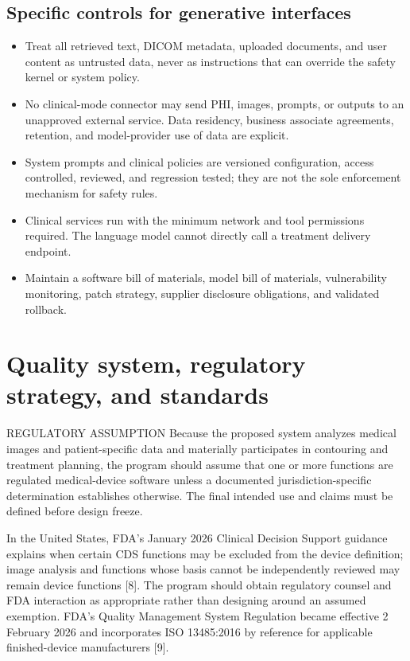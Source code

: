 \documentclass[11pt,letterpaper]{article}
\begin{document}
\subsection{Specific controls for generative interfaces}

\begin{itemize}
\item Treat all retrieved text, DICOM metadata, uploaded documents, and user content as untrusted data, never as instructions that can override the safety kernel or system policy.
\item No clinical-mode connector may send PHI, images, prompts, or outputs to an unapproved external service. Data residency, business associate agreements, retention, and model-provider use of data are explicit.
\item System prompts and clinical policies are versioned configuration, access controlled, reviewed, and regression tested; they are not the sole enforcement mechanism for safety rules.
\item Clinical services run with the minimum network and tool permissions required. The language model cannot directly call a treatment delivery endpoint.
\item Maintain a software bill of materials, model bill of materials, vulnerability monitoring, patch strategy, supplier disclosure obligations, and validated rollback.
\end{itemize}

\section{Quality system, regulatory strategy, and standards}

\begin{nlnotice}{REGULATORY ASSUMPTION}
Because the proposed system analyzes medical images and patient-specific data and materially participates in contouring and treatment planning, the program should assume that one or more functions are regulated medical-device software unless a documented jurisdiction-specific determination establishes otherwise. The final intended use and claims must be defined before design freeze.
\end{nlnotice}

In the United States, FDA's January 2026 Clinical Decision Support guidance explains when certain CDS functions may be excluded from the device definition; image analysis and functions whose basis cannot be independently reviewed may remain device functions [8]. The program should obtain regulatory counsel and FDA interaction as appropriate rather than designing around an assumed exemption. FDA's Quality Management System Regulation became effective 2 February 2026 and incorporates ISO 13485:2016 by reference for applicable finished-device manufacturers [9].
\end{document}
